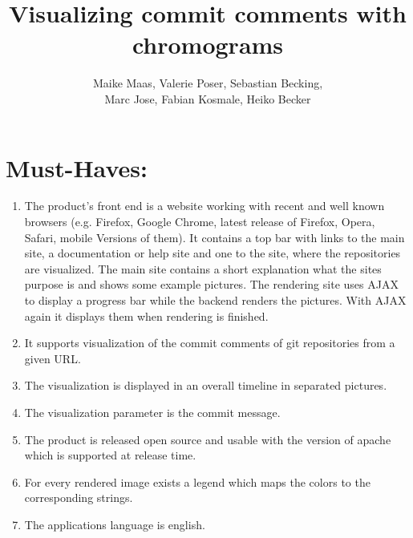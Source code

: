 \documentclass[12pt]{scrartcl}
\author{Maike Maas, Valerie Poser, Sebastian Becking,\\
Marc Jose, Fabian Kosmale, Heiko Becker}
\title{Visualizing commit comments with chromograms}
\begin{document}
\maketitle
\section{Must-Haves:}
\begin{enumerate}
\item The product's front end is a website working with recent and well known browsers (e.g. Firefox, Google Chrome, latest release of Firefox, Opera, Safari, mobile Versions of them). It contains a top bar with links to the main site, a documentation or help site and one to the site, where the repositories are visualized. The main site contains a short explanation what the sites purpose is and shows some example pictures. The rendering site uses AJAX to display a progress bar while the backend renders the pictures. With AJAX again it displays them when rendering is finished.
\item It supports visualization of the commit comments of git repositories from a given URL. 
\item The visualization is displayed in an overall timeline in separated pictures.
\item The visualization parameter is the commit message.
\item The product is released open source and usable with the version of apache which is supported at release time.
\item For every rendered image exists a legend which maps the colors to the corresponding strings.
\item The applications language is english.
\end{enumerate}
\end{document}
